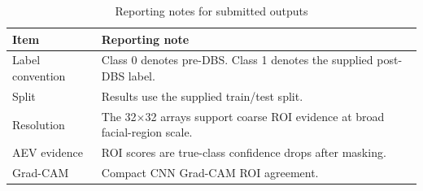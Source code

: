 \begin{table}[htbp]
\centering
\scriptsize
\caption{Reporting notes for submitted outputs}
\begin{tabularx}{\textwidth}{>{\raggedright\arraybackslash}X>{\raggedright\arraybackslash}X}
\toprule
Item & Reporting note \\
\midrule
Label convention & Class 0 denotes pre-DBS. Class 1 denotes the supplied post-DBS label. \\
Split & Results use the supplied train/test split. \\
Resolution & The 32$\times$32 arrays support coarse ROI evidence at broad facial-region scale. \\
AEV evidence & ROI scores are true-class confidence drops after masking. \\
Grad-CAM & Compact CNN Grad-CAM ROI agreement. \\
\bottomrule
\end{tabularx}
\end{table}

